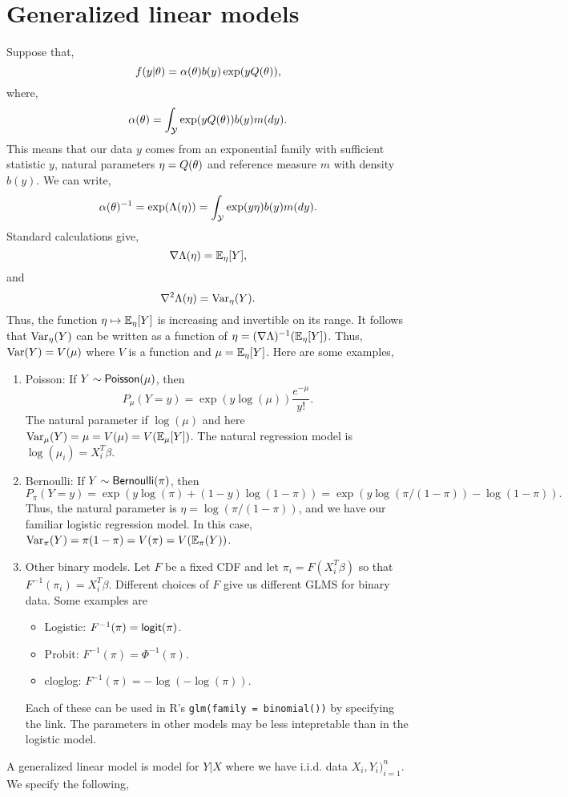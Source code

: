 \section{Generalized linear models}
Suppose that,
\[f(y|{\theta}) = \alpha({\theta})b(y)\exp(yQ({\theta})), \]
where,
\[\alpha({\theta}) = \int_{\mathcal{Y}} \exp(yQ({\theta}))b(y)m(dy). \]
This means that our data $y$ comes from an exponential family with sufficient statistic $y$, natural parameters $\eta = Q({\theta})$ and reference measure $m$ with density $b(y)$. We can write,
\[{\alpha}({\theta})^{-1} = \exp(\Lambda(\eta)) =\int_{\mathcal{Y}} \exp(y\eta)b(y)m(dy). \]
Standard calculations give,
\[\nabla \Lambda(\eta) = {\mathbb{E}}_\eta[Y], \]
and 
\[\nabla^2 \Lambda(\eta) = \operatorname{Var}_\eta(Y). \] 
Thus, the function $\eta \mapsto {\mathbb{E}}_\eta[Y]$ is increasing and invertible on its range. It follows that $\operatorname{Var}_\eta(Y)$ can be written as a function of $\eta = (\nabla \Lambda)^{-1}({\mathbb{E}}_\eta[Y])$. Thus, $\operatorname{Var}(Y) = V(\mu)$ where $V$ is a function and $\mu = {\mathbb{E}}_\eta[Y]$. Here are some examples,
\begin{enumerate}
    \item Poisson: If $Y \sim \mathsf{Poisson}(\mu)$, then \[P_\mu(Y=y)=\exp(y\log(\mu))\frac{e^{-\mu}}{y!}.\]
    The natural parameter if $\log(\mu)$ and here $\operatorname{Var}_\mu(Y)=\mu=V(\mu)=V({\mathbb{E}}_\mu[Y])$. The natural regression model is $\log(\mu_i)=X_i^T\beta$.
    \item Bernoulli: If $Y\sim \mathsf{Bernoulli}(\pi)$, then \[P_{\pi}(Y=y) = \exp(y\log(\pi)+(1-y)\log(1-\pi))=\exp(y\log(\pi/(1-\pi))-\log(1-\pi)).\]
    Thus, the natural parameter is $\eta = \log(\pi/(1-\pi))$, and we have our familiar logistic regression model. In this case, $\operatorname{Var}_\pi(Y)=\pi(1-\pi)=V(\pi)=V({\mathbb{E}}_\pi(Y))$.
    \item Other binary models. Let $F$ be a fixed CDF and let $\pi_i = F(X_i^T\beta)$ so that $F^{-1}(\pi_i)=X_i^T\beta$. Different choices of $F$ give  us different GLMS for binary data. Some examples are
    \begin{itemize}
        \item Logistic: $F^{-1}(\pi)=\mathsf{logit}(\pi)$.
        \item Probit: $F^{-1}(\pi)=\Phi^{-1}(\pi)$.
        \item cloglog: $F^{-1}(\pi)=-\log(-\log(\pi))$.
    \end{itemize}
    Each of these  can be used in R's \texttt{glm(family = binomial())} by specifying the link. The parameters in other models may be less intepretable than in the logistic model.
\end{enumerate}
A generalized linear model is model  for $Y|X$ where we have i.i.d.  data $X_i,Y_i)_{i=1}^n$.  We specify  the  following,
